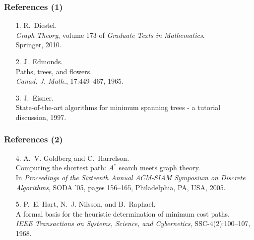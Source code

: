 \documentclass[titlepage,german,presentation]{beamer}
\begin{document}
\begin{frame}
\frametitle{References (1)}

\begin{itemize}
\item[1.]
R.~{Diestel}.\\
{\em {Graph Theory}}, volume 173 of {\em Graduate Texts in Mathematics}.\\
Springer, 2010.

\item[2.]
J.~{Edmonds}.\\
Paths, trees, and flowers.\\
{\em Canad. J. Math.}, 17:449--467, 1965.

\item[3.]
J.~{Eisner}.\\
State-of-the-art algorithms for minimum spanning trees - a tutorial discussion, 1997.

\end{itemize}
\end{frame}

\begin{frame}
\frametitle{References (2)}

\begin{itemize}
\item[4.]
A.~V. {Goldberg} and C.~{Harrelson}.\\
Computing the shortest path: $A^*$ search meets graph theory.\\
In {\em Proceedings of the Sixteenth Annual ACM-SIAM Symposium on
  Discrete Algorithms}, SODA '05, pages 156--165, Philadelphia, PA, USA, 2005.

\item[5.]
P.~E. {Hart}, N.~J. {Nilsson}, and B.~{Raphael}.\\
A formal basis for the heuristic determination of minimum cost paths.\\
{\em IEEE Transactions on Systems, Science, and Cybernetics},
  SSC-4(2):100--107, 1968.
\end{itemize}

\end{frame}
\end{document}

